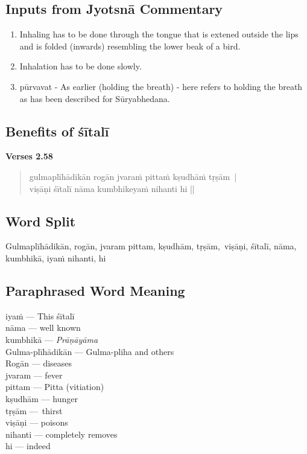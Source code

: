 \subsection*{Inputs from Jyotsnā Commentary}
\vspace{-10pt}

\begin{enumerate}
\itemsep=0pt
\item Inhaling has to be done through the tongue that is extened outside the lips and is folded (inwards) resembling the lower beak of a bird.
\item Inhalation has to be done slowly.
\item pūrvavat - As earlier (holding the breath) - here refers to holding the breath as has been described for Sūryabhedana. 
\end{enumerate}

\subsection*{Benefits of śītalī}


\noindent \textbf{Verses 2.58}

\begin{verse}
gulmaplīhādikān rogān jvaraṁ pittaṁ kṣudhāṁ tṛṣām |\\
viṣāṇi śītalī nāma kumbhikeyaṁ nihanti hi ||
\end{verse}

\subsection*{Word Split}


Gulmaplīhādikān, rogān, jvaram pittam, kṣudhām, tṛṣām, viṣāṇi, śītalī, nāma, kumbhikā, iyaṁ nihanti, hi

\subsection*{Paraphrased Word Meaning}


\begin{multicols}{2}
iyaṁ --- This śītalī \\
nāma --- well known \\
kumbhikā --- \textit{Prāṇāyāma}\\
Gulma-plīhādikān --- Gulma-pliha and others \\
Rogān --- diseases \\
jvaram --- fever\\
pittam --- Pitta (vitiation)\\
kṣudhām --- hunger \\
tṛṣām --- thirst \\
viṣāṇi --- poisons\\
nihanti --- completely removes\\
hi --- indeed
\end{multicols}

